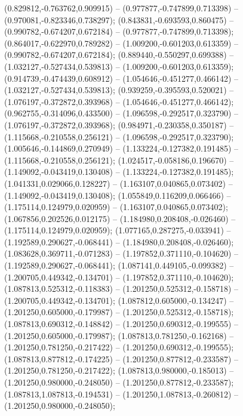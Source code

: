  (0.829812,-0.763762,0.909915) -- (0.977877,-0.747899,0.713398) -- (0.970081,-0.823346,0.738297);
 (0.843831,-0.693593,0.860475) -- (0.990782,-0.674207,0.672184) -- (0.977877,-0.747899,0.713398);
 (0.864017,-0.622970,0.789282) -- (1.009200,-0.601203,0.613359) -- (0.990782,-0.674207,0.672184);
 (0.889440,-0.550297,0.699388) -- (1.032127,-0.527434,0.539813) -- (1.009200,-0.601203,0.613359);
 (0.914739,-0.474439,0.608912) -- (1.054646,-0.451277,0.466142) -- (1.032127,-0.527434,0.539813);
 (0.939259,-0.395593,0.520021) -- (1.076197,-0.372872,0.393968) -- (1.054646,-0.451277,0.466142);
 (0.962755,-0.314096,0.433500) -- (1.096598,-0.292517,0.323790) -- (1.076197,-0.372872,0.393968);
 (0.984971,-0.230358,0.350187) -- (1.115668,-0.210558,0.256121) -- (1.096598,-0.292517,0.323790);
 (1.005646,-0.144869,0.270949) -- (1.133224,-0.127382,0.191485) -- (1.115668,-0.210558,0.256121);
 (1.024517,-0.058186,0.196670) -- (1.149092,-0.043419,0.130408) -- (1.133224,-0.127382,0.191485);
 (1.041331,0.029066,0.128227) -- (1.163107,0.040865,0.073402) -- (1.149092,-0.043419,0.130408);
 (1.055849,0.116209,0.066466) -- (1.175114,0.124979,0.020959) -- (1.163107,0.040865,0.073402);
 (1.067856,0.202526,0.012175) -- (1.184980,0.208408,-0.026460) -- (1.175114,0.124979,0.020959);
 (1.077165,0.287275,-0.033941) -- (1.192589,0.290627,-0.068441) -- (1.184980,0.208408,-0.026460);
 (1.083628,0.369711,-0.071283) -- (1.197852,0.371110,-0.104620) -- (1.192589,0.290627,-0.068441);
 (1.087141,0.449105,-0.099382) -- (1.200705,0.449342,-0.134701) -- (1.197852,0.371110,-0.104620);
 (1.087813,0.525312,-0.118383) -- (1.201250,0.525312,-0.158718) -- (1.200705,0.449342,-0.134701);
 (1.087812,0.605000,-0.134247) -- (1.201250,0.605000,-0.179987) -- (1.201250,0.525312,-0.158718);
 (1.087813,0.690312,-0.148842) -- (1.201250,0.690312,-0.199555) -- (1.201250,0.605000,-0.179987);
 (1.087813,0.781250,-0.162168) -- (1.201250,0.781250,-0.217422) -- (1.201250,0.690312,-0.199555);
 (1.087813,0.877812,-0.174225) -- (1.201250,0.877812,-0.233587) -- (1.201250,0.781250,-0.217422);
 (1.087813,0.980000,-0.185013) -- (1.201250,0.980000,-0.248050) -- (1.201250,0.877812,-0.233587);
 (1.087813,1.087813,-0.194531) -- (1.201250,1.087813,-0.260812) -- (1.201250,0.980000,-0.248050);
